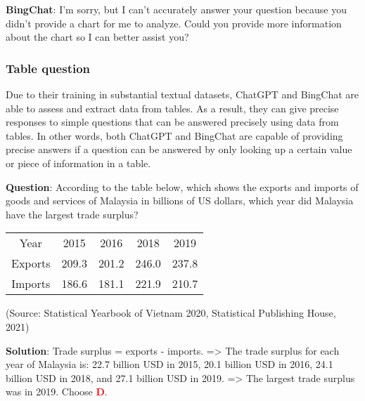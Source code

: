 \documentclass{article}
\begin{document}
{\begin{mdframed}[linewidth=1pt,linecolor=red]
		
		\textbf{BingChat}: I’m sorry, but I can’t accurately answer your question because you didn’t provide a chart for me to analyze. Could you provide more information about the chart so I can better assist you?
		
		
		
	\end{mdframed}	
	
	
	
	\subsubsection{Table question}
	\label{VNHSGE_Geo_Table}
	
	Due to their training in substantial textual datasets, ChatGPT and BingChat are able to assess and extract data from tables. As a result, they can give precise responses to simple questions that can be answered precisely using data from tables. In other words, both ChatGPT and BingChat are capable of providing precise answers if a question can be answered by only looking up a certain value or piece of information in a table.
	
	
	
	\begin{mdframed}[linewidth=1pt,linecolor=red] \textbf{Question}: According to the table below, which shows the exports and imports of goods and services of Malaysia in billions of US dollars, which year did Malaysia have the largest trade surplus?
		
		\begin{tabular}{ccccc}
			\multicolumn{1}{c}{Year} & 2015  & 2016  & 2018  & 2019   \\
			Exports                       & 209.3 & 201.2 & 246.0 & 237.8  \\
			Imports                       & 186.6 & 181.1 & 221.9 & 210.7  
		\end{tabular}
		
		(Source: Statistical Yearbook of Vietnam 2020, Statistical Publishing House, 2021)
		
		
		
		\begin{oneparchoices}
		\end{oneparchoices}
		
		\textbf{Solution}: Trade surplus = exports - imports. => The trade surplus for each year of Malaysia is: 22.7 billion USD in 2015, 20.1 billion USD in 2016, 24.1 billion USD in 2018, and 27.1 billion USD in 2019. => The largest trade surplus was in 2019.
		Choose \textcolor{red}{\textbf{D}}.
		

\end{mdframed}}
\end{document}
